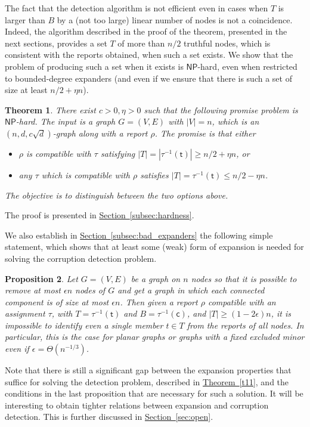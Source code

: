 \documentclass[11pt]{article}
\numberwithin{equation}{section}
\newtheorem{theorem}{Theorem}[section]
\newtheorem{proposition}[theorem]{Proposition}
\theoremstyle{definition}
\theoremstyle{plain}
\newcommand{\cclass}[1]{\textsf{#1}}
\newcommand{\expref}[2]{\hyperref[#2]{#1~\ref{#2}}}
\begin{document}
The fact that the detection algorithm is not efficient
even in cases when $T$ is larger than $B$ by a (not too large) 
linear number of nodes
%
%
is not a coincidence. Indeed, the algorithm described
in the proof of the theorem, presented
in the next sections, provides a set $T$ of more than $n/2$ truthful
nodes, which is consistent with the reports obtained, when such a
set exists. We show that the problem of producing
such a set when it exists is $\cclass{NP}$-hard,
even when restricted to bounded-degree expanders (and even if 
we ensure that there is such a set of size at least
$n/2+\eta n$).
\begin{theorem}
\label{t12}
%
There exist $c > 0, \eta > 0$ 
such that the following promise problem is 
$\cclass{NP}$-hard. The input is a graph $G=(V,E)$ with $|V| = n$, 
which is an $(n,d,c\sqrt{d})$-graph  
along with a report $\rho$. 
%
%
The promise is that either
\begin{itemize}
\item 
$\rho$ is compatible with $\tau$ satisfying  
$|T| = |\tau^{-1}(\mathsf{t})| \geq n/2 + \eta n$, or
\item 
any $\tau$ which is compatible with $\rho$ satisfies 
 $|T| = \tau^{-1}(\mathsf{t})  \leq n/2 - \eta n$. 
\end{itemize}
The objective is to distinguish between the two options above.
\end{theorem}
The proof is presented in \expref{Section}{subsec:hardness}.
%

We also establish in \expref{Section}{subsec:bad_expanders} the 
following simple statement, 
which shows that at least some
(weak) form of expansion is needed for solving the
corruption detection problem.
\begin{proposition}
\label{p13}
Let $G=(V,E)$ be a graph on $n$ nodes so that it is possible to
remove at most $\epsilon n$ nodes of $G$  and get a graph in which 
%
each   %
connected component is of size at most $\epsilon n$. Then given a report 
$\rho$ compatible with an assignment $\tau$, with $T = \tau^{-1}(\mathsf{t})$ and $B =  \tau^{-1}(\mathsf{c})$,
and $|T| \geq (1-2 \epsilon) n$, it is impossible to
identify even a single member $t \in T$ from the reports of
all nodes. In particular, this is the case for planar graphs or
graphs with a fixed excluded minor even if
$\epsilon=\Theta(n^{-1/3})$.
\end{proposition}

Note that there is still a significant gap between the expansion properties
that suffice for solving the detection problem, described in 
\expref{Theorem}{t11},  and the conditions in the last proposition that are
necessary for such a solution. It will be interesting to obtain tighter
relations between expansion and corruption detection. This is
further discussed in \expref{Section}{sec:open}.
\end{document}

